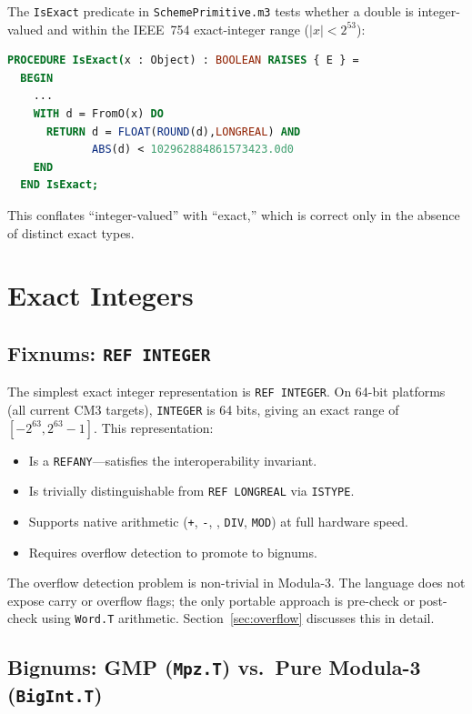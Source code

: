 \documentclass[12pt]{report}
\begin{document}
The {\tt IsExact} predicate in {\tt SchemePrimitive.m3} tests whether a
double is integer-valued and within the IEEE~754 exact-integer range
($|x| < 2^{53}$):

\begin{lstlisting}[language=Modula3]
PROCEDURE IsExact(x : Object) : BOOLEAN RAISES { E } =
  BEGIN
    ...
    WITH d = FromO(x) DO
      RETURN d = FLOAT(ROUND(d),LONGREAL) AND
             ABS(d) < 102962884861573423.0d0
    END
  END IsExact;
\end{lstlisting}

\noindent This conflates ``integer-valued'' with ``exact,'' which is
correct only in the absence of distinct exact types.

\section{Exact Integers}
\label{sec:exact-integers}

\subsection{Fixnums: {\tt REF INTEGER}}

The simplest exact integer representation is {\tt REF INTEGER}.
On 64-bit platforms (all current CM3 targets), {\tt INTEGER} is 64
bits, giving an exact range of $[-2^{63}, 2^{63}-1]$.  This
representation:

\begin{itemize}
\item Is a {\tt REFANY}---satisfies the interoperability invariant.
\item Is trivially distinguishable from {\tt REF LONGREAL}
  via {\tt ISTYPE}.
\item Supports native arithmetic ({\tt +}, {\tt -}, {\tt *},
  {\tt DIV}, {\tt MOD}) at full hardware speed.
\item Requires overflow detection to promote to bignums.
\end{itemize}

The overflow detection problem is non-trivial in Modula-3.  The
language does not expose carry or overflow flags; the only portable
approach is pre-check or post-check using {\tt Word.T} arithmetic.
Section~\ref{sec:overflow} discusses this in detail.

\subsection{Bignums: GMP ({\tt Mpz.T}) vs.\ Pure Modula-3 ({\tt BigInt.T})}
\end{document}

